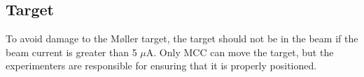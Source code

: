 \begin{safetyen}{50}{50}
\subsection{Target}

To avoid damage to the M{\o}ller target, the target should not be in the beam 
if the beam current is greater than
5 $\mu$A. Only MCC can move the target, but the experimenters
are responsible for ensuring that it is properly positioned.\\
\end{safetyen}




%
%
%
%
%
%
 




%
%
%
%
%
%
%
